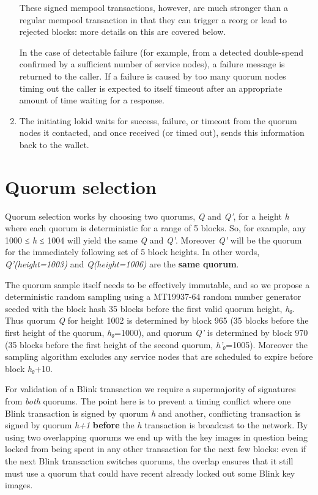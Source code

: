 \begin{enumerate}
  These signed mempool transactions, however, are much stronger than a
  regular mempool transaction in that they can trigger a reorg or lead
  to rejected blocks: more details on this are covered below.

  In the case of detectable failure (for example, from a detected
  double-spend confirmed by a sufficient number of service nodes), a
  failure message is returned to the caller. If a failure is caused by
  too many quorum nodes timing out the caller is expected to itself
  timeout after an appropriate amount of time waiting for a response.
\item
  The initiating lokid waits for success, failure, or timeout from the
  quorum nodes it contacted, and once received (or timed out), sends
  this information back to the wallet.
\end{enumerate}

\hypertarget{quorum-selection}{%
\section{Quorum selection}\label{quorum-selection}}

Quorum selection works by choosing two quorums, \emph{Q} and \emph{Q'},
for a height \emph{h} where each quorum is deterministic for a range of
5 blocks. So, for example, any 1000 ≤ \emph{h} ≤ 1004 will yield the
same \emph{Q} and \emph{Q'}. Moreover \emph{Q'} will be the quorum for
the immediately following set of 5 block heights. In other words,
\emph{Q'(height=1003)} and \emph{Q(height=1006)} are the \textbf{same
quorum}.

The quorum sample itself needs to be effectively immutable, and so we
propose a deterministic random sampling using a MT19937-64 random number
generator seeded with the block hash 35 blocks before the first valid
quorum height, \emph{h₀}. Thus quorum \emph{Q} for height 1002 is
determined by block 965 (35 blocks before the first height of the
quorum, \emph{h₀}=1000), and quorum \emph{Q'} is determined by block 970
(35 blocks before the first height of the second quorum,
\emph{h'₀}=1005). Moreover the sampling algorithm excludes any service
nodes that are scheduled to expire before block \emph{h₀}+10.

For validation of a Blink transaction we require a supermajority of
signatures from \emph{both} quorums. The point here is to prevent a
timing conflict where one Blink transaction is signed by quorum \emph{h}
and another, conflicting transaction is signed by quorum \emph{h+1}
\textbf{before} the \emph{h} transaction is broadcast to the network. By
using two overlapping quorums we end up with the key images in question
being locked from being spent in any other transaction for the next few
blocks: even if the next Blink transaction switches quorums, the overlap
ensures that it still must use a quorum that could have recent already
locked out some Blink key images.

